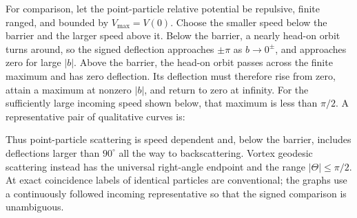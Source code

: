 \begin{enumerate}
  For comparison, let the point-particle relative potential be repulsive,
  finite ranged, and bounded by \(V_{\max}=V(0)\).  Choose the smaller
  speed below the barrier and the larger speed above it.  Below the
  barrier, a nearly head-on orbit turns around, so the signed deflection
  approaches \(\pm\pi\) as \(b\to0^\pm\), and approaches zero for large
  \(|b|\).  Above the barrier, the head-on orbit passes across the finite
  maximum and has zero deflection.  Its deflection must therefore rise
  from zero, attain a maximum at nonzero \(|b|\), and return to zero at
  infinity.  For the sufficiently large incoming speed shown below,
  that maximum is less than \(\pi/2\).  A representative pair of
  qualitative curves is:

  \begin{center}
  \end{center}

  Thus point-particle scattering is speed dependent and, below the
  barrier, includes deflections larger than \(90^\circ\) all the way to
  backscattering.  Vortex geodesic scattering instead has the universal
  right-angle endpoint and the range
  \(|\Theta|\leq\pi/2\).  At exact coincidence labels of identical
  particles are conventional; the graphs use a continuously followed
  incoming representative so that the signed comparison is unambiguous.


\end{enumerate}
